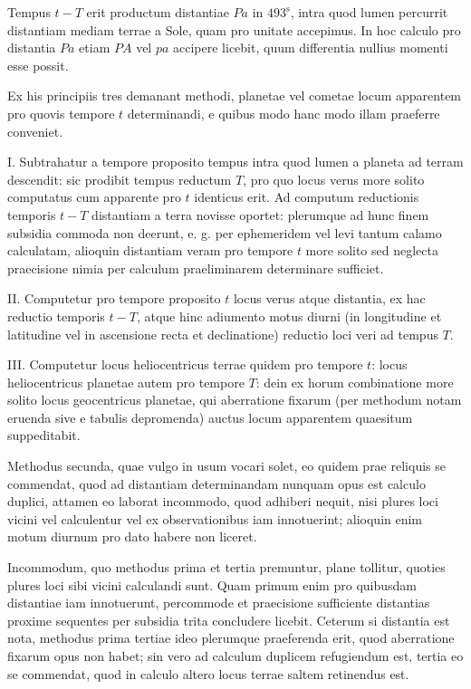 Tempus $t-T$ erit productum distantiae $Pa$ in $493^{\mathrm{s}}$, intra quod lumen percurrit distantiam mediam terrae a Sole, quam pro unitate accepimus. In hoc calculo pro distantia $Pa$ etiam $PA$ vel $pa$ accipere licebit, quum differentia nullius momenti esse possit.

Ex his principiis tres demanant methodi, planetae vel cometae locum apparentem pro quovis tempore $t$ determinandi, e quibus modo hanc modo illam praeferre conveniet.

I. Subtrahatur a tempore proposito tempus intra quod lumen a planeta ad terram descendit: sic prodibit tempus reductum $T$, pro quo locus verus more solito computatus cum apparente pro $t$ identicus erit. Ad computum reductionis temporis $t-T$ distantiam a terra novisse oportet: plerumque ad hunc finem subsidia commoda non deerunt, e. g. per ephemeridem vel levi tantum calamo calculatam, alioquin distantiam veram pro tempore $t$ more solito sed neglecta praecisione nimia per calculum praeliminarem determinare sufficiet.

II. Computetur pro tempore proposito $t$ locus verus atque distantia, ex hac reductio temporis $t-T$, atque hinc adiumento motus diurni (in longitudine et latitudine vel in ascensione recta et declinatione) reductio loci veri ad tempus $T$.

III. Computetur locus heliocentricus terrae quidem pro tempore $t$: locus heliocentricus planetae autem pro tempore $T$: dein ex horum combinatione more solito locus geocentricus planetae, qui aberratione fixarum (per methodum notam eruenda sive e tabulis depromenda) auctus locum apparentem quaesitum suppeditabit.

Methodus secunda, quae vulgo in usum vocari solet, eo quidem prae reliquis se commendat, quod ad distantiam determinandam nunquam opus est calculo duplici, attamen eo laborat incommodo, quod adhiberi nequit, nisi plures loci vicini vel calculentur vel ex observationibus iam innotuerint; alioquin enim motum diurnum pro dato habere non liceret.

Incommodum, quo methodus prima et tertia premuntur, plane tollitur, quoties plures loci sibi vicini calculandi sunt. Quam primum enim pro quibusdam distantiae iam innotuerunt, percommode et praecisione sufficiente distantias proxime sequentes per subsidia trita concludere licebit. Ceterum si distantia est nota, methodus prima tertiae ideo plerumque praeferenda erit, quod aberratione fixarum opus non habet; sin vero ad calculum duplicem refugiendum est, tertia eo se commendat, quod in calculo altero locus terrae saltem retinendus est.


